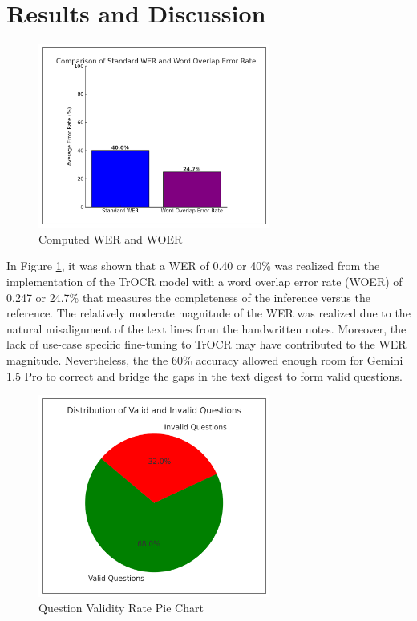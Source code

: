 \documentclass[conference]{IEEEtran}
\begin{document}
\section{Results and Discussion}
\vspace{-0.2cm}
\begin{figure}[H]
    \centerline{\includegraphics[width=3in]{wer.png}}
    \vspace{-0.5cm}
    \caption{Computed WER and WOER} 
    \label{wer}
    \end{figure}
\indent In Figure \ref{wer}, it was shown that a WER of 0.40 or 40\% 
was realized from the implementation of the TrOCR model with a 
word overlap error rate (WOER) of 0.247 or 24.7\% that 
measures the completeness of the inference versus the reference.
The relatively moderate magnitude of the WER was realized due to the 
natural misalignment of the text lines from the handwritten notes. 
Moreover, the lack of use-case specific fine-tuning to TrOCR 
may have contributed to the WER magnitude. Nevertheless, the
the 60\% accuracy allowed enough room for Gemini 1.5 Pro to correct 
and bridge the gaps in the text digest to form valid questions.
\begin{figure}[H]
    \centerline{\includegraphics[width=3in]{validity.png}}
    \vspace{-0.5cm}
    \caption{Question Validity Rate Pie Chart} 
    \label{validity}
    \end{figure}
\end{document}
